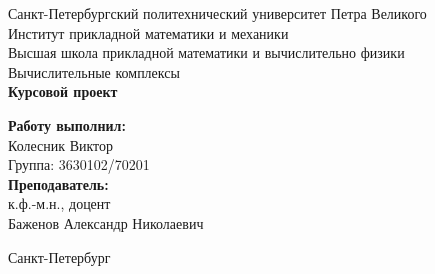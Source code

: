 \begin{titlepage}	%

	\begin{center}		%

		\large Санкт-Петербургский политехнический университет Петра Великого\\
		\large Институт прикладной математики и механики \\
		\large Высшая школа прикладной математики и вычислительно физики \\[6cm]
		
		\huge Вычислительные комплексы\\[0.5cm] %
		\large \textbf{Курсовой проект}\\[5.1cm]

	\end{center}


	\begin{flushright} %
		\begin{minipage}{0.25\textwidth} %
			\begin{flushleft} %

				\large\textbf{Работу выполнил:}\\
				\large Колесник Виктор\\
				\large {Группа:} 3630102/70201\\
				
				\large \textbf{Преподаватель:}\\
				\large к.ф.-м.н., доцент\\
				\large Баженов Александр Николаевич

			\end{flushleft}
		\end{minipage}
	\end{flushright}
	
	\vfill %

	\begin{center}
	\large Санкт-Петербург\\
	\large \the\year %
	\end{center} %

\end{titlepage} %

\vfill %
